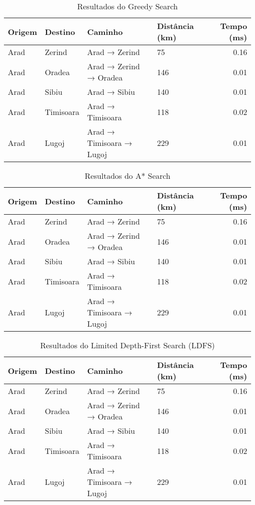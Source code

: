 \documentclass[12pt,a4paper]{article}
\begin{document}
\begin{table}[H]
\centering
\caption{Resultados do Greedy Search}
\begin{tabular}{llllr}
\toprule
Origem & Destino & Caminho & Distância (km) & Tempo (ms) \\
\midrule
Arad & Zerind & Arad → Zerind & 75 & 0.16 \\
Arad & Oradea & Arad → Zerind → Oradea & 146 & 0.01 \\
Arad & Sibiu & Arad → Sibiu & 140 & 0.01 \\
Arad & Timisoara & Arad → Timisoara & 118 & 0.02 \\
Arad & Lugoj & Arad → Timisoara → Lugoj & 229 & 0.01 \\
\bottomrule
\end{tabular}
\end{table}

\begin{table}[H]
\centering
\caption{Resultados do A* Search}
\begin{tabular}{llllr}
\toprule
Origem & Destino & Caminho & Distância (km) & Tempo (ms) \\
\midrule
Arad & Zerind & Arad → Zerind & 75 & 0.16 \\
Arad & Oradea & Arad → Zerind → Oradea & 146 & 0.01 \\
Arad & Sibiu & Arad → Sibiu & 140 & 0.01 \\
Arad & Timisoara & Arad → Timisoara & 118 & 0.02 \\
Arad & Lugoj & Arad → Timisoara → Lugoj & 229 & 0.01 \\
\bottomrule
\end{tabular}
\end{table}

\begin{table}[H]
\centering
\caption{Resultados do Limited Depth-First Search (LDFS)}
\begin{tabular}{llllr}
\toprule
Origem & Destino & Caminho & Distância (km) & Tempo (ms) \\
\midrule
Arad & Zerind & Arad → Zerind & 75 & 0.16 \\
Arad & Oradea & Arad → Zerind → Oradea & 146 & 0.01 \\
Arad & Sibiu & Arad → Sibiu & 140 & 0.01 \\
Arad & Timisoara & Arad → Timisoara & 118 & 0.02 \\
Arad & Lugoj & Arad → Timisoara → Lugoj & 229 & 0.01 \\
\bottomrule
\end{tabular}
\end{table}
\end{document}
